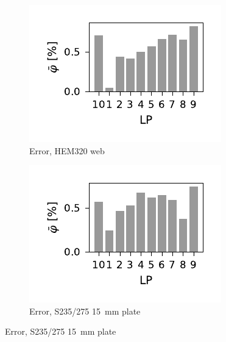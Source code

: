 \documentclass[a4paper,11pt]{article}
\begin{document}
\begin{figure}
    \centering
    \begin{subfigure}[b]{0.45\linewidth}
        \centering
        \includegraphics{error_WP3_HEM320_C_CRM20.pdf}
        \caption{Error, HEM320 web}
        \label{fig:hem320-error}
    \end{subfigure}
    \begin{subfigure}[b]{0.45\linewidth}
        \centering
        \includegraphics{error_S235275_Plate15.pdf}
        \caption{Error, S235/275 15~mm plate}
        \label{fig:s235275-error}
    \end{subfigure}


\end{figure}
\end{document}
